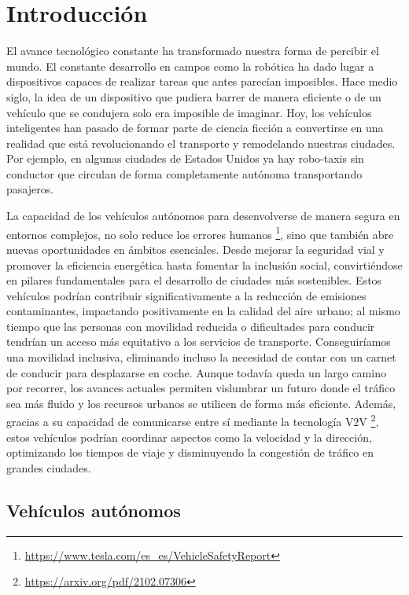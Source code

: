 \chapter{Introducción}
\label{cap:introduccion}
\setcounter{page}{1}

El avance tecnológico constante ha transformado nuestra forma de percibir el mundo. El constante desarrollo en campos como la robótica ha dado lugar a dispositivos capaces de realizar tareas que antes parecían imposibles. Hace medio siglo, la idea de un dispositivo que pudiera barrer de manera eficiente o de un vehículo que se condujera solo era imposible de imaginar. Hoy, los vehículos inteligentes han pasado de formar parte de ciencia ficción a convertirse en una realidad que está revolucionando el transporte y remodelando nuestras ciudades. Por ejemplo, en algunas ciudades de Estados Unidos ya hay robo-taxis sin conductor que circulan de forma completamente autónoma transportando pasajeros.

La capacidad de los vehículos autónomos para desenvolverse de manera segura en entornos complejos, no solo reduce los errores humanos \footnote{\url{https://www.tesla.com/es_es/VehicleSafetyReport}}, sino que también abre nuevas oportunidades en ámbitos esenciales. Desde mejorar la seguridad vial y promover la eficiencia energética hasta fomentar la inclusión social, convirtiéndose en pilares fundamentales para el desarrollo de ciudades más sostenibles. Estos vehículos podrían contribuir significativamente a la reducción de emisiones contaminantes, impactando positivamente en la calidad del aire urbano; al mismo tiempo que las personas con movilidad reducida o dificultades para conducir tendrían un acceso más equitativo a los servicios de transporte. Conseguiríamos una movilidad inclusiva, eliminando incluso la necesidad de contar con un carnet de conducir para desplazarse en coche. Aunque todavía queda un largo camino por recorrer, los avances actuales permiten vislumbrar un futuro donde el tráfico sea más fluido y los recursos urbanos se utilicen de forma más eficiente. Además, gracias a su capacidad de comunicarse entre sí mediante la tecnología \ac{V2V} \footnote{\url{https://arxiv.org/pdf/2102.07306}}, estos vehículos podrían coordinar aspectos como la velocidad y la dirección, optimizando los tiempos de viaje y disminuyendo la congestión de tráfico en grandes ciudades.

\section{Vehículos autónomos}
\label{sec:vehículos}

